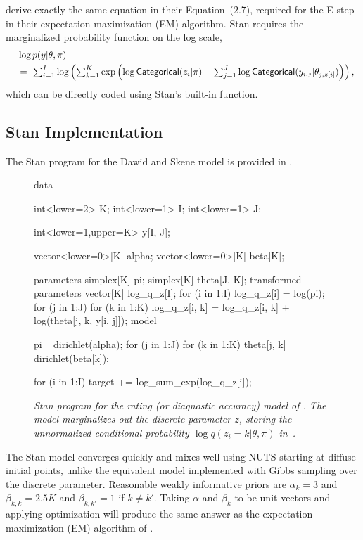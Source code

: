 \cite{DawidSkene:1979} derive exactly the same equation in their
Equation~(2.7), required for the E-step in their expectation
maximization (EM) algorithm.  Stan requires the marginalized
probability function on the log scale,
\[
\begin{array}{l}
\mbox{ } \ \log p(y | \theta, \pi)
\\[3pt]
\mbox{ } \  = \
\sum_{i=1}^I \log \left( \sum_{k=1}^K \exp
  \left( \log \distro{Categorical}(z_i | \pi)
         + \sum_{j=1}^J
         \log \distro{Categorical}(y_{i, j}|\theta_{j, z[i]})
  \right) \right),
\end{array}
\]                            
which can be directly coded using Stan's built-in 
function.


\subsection{Stan Implementation}

The Stan program for the Dawid and Skene model is provided in
.
%
\begin{figure}
\begin{stancode}
data {
  int<lower=2> K;
  int<lower=1> I;
  int<lower=1> J;

  int<lower=1,upper=K> y[I, J];

  vector<lower=0>[K] alpha;
  vector<lower=0>[K] beta[K];
}
parameters {
  simplex[K] pi;
  simplex[K] theta[J, K];
}
transformed parameters {
  vector[K] log_q_z[I];
  for (i in 1:I) {
    log_q_z[i] = log(pi);
    for (j in 1:J)
      for (k in 1:K)
        log_q_z[i, k] = log_q_z[i, k] 
                         + log(theta[j, k, y[i, j]]);
  }
}
model {
  pi ~ dirichlet(alpha);
  for (j in 1:J)
    for (k in 1:K)
      theta[j, k] ~ dirichlet(beta[k]);

  for (i in 1:I)
    target += log_sum_exp(log_q_z[i]);
}
\end{stancode}
\vspace*{-12pt}
\caption{\small\it Stan program for the rating (or diagnostic
  accuracy) model of \cite{DawidSkene:1979}. The model marginalizes
  out the discrete parameter $z$, storing the unnormalized conditional
  probability $\log q(z_i=k|\theta,\pi)$ in\ \code{log\_q\_z[i,~k]}.}%
\label{dawid-skene-model.figure}
\end{figure}
%
The Stan model converges quickly and mixes well using NUTS starting at
diffuse initial points, unlike the equivalent model implemented with
Gibbs sampling over the discrete parameter.  Reasonable weakly
informative priors are $\alpha_k = 3$ and $\beta_{k,k} = 2.5 K$ and
$\beta_{k,k'} = 1$ if $k \neq k'$.  Taking $\alpha$ and $\beta_k$ to
be unit vectors and applying optimization will produce the same answer
as the expectation maximization (EM) algorithm of
\cite{DawidSkene:1979}.  

